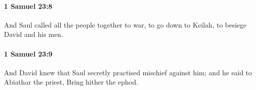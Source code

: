 		\paragraph{1 Samuel 23:8} %
			\label{1SAMUEL-23-8}

			And Saul called all the people together to war, to go down to Keilah, to besiege David and his men.


		\paragraph{1 Samuel 23:9} %
			\label{1SAMUEL-23-9}

			And David knew that Saul secretly practised mischief against him; and he said to Abiathar the priest, Bring hither the ephod.


